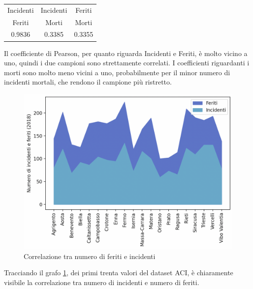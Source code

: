 \documentclass[a4paper]{report}
\begin{document}
\begin{center}
    \def\arraystretch{1.5}%
    \begin{tabular}{ |c|c|c| } 
    \hline
    Incidenti & Incidenti & Feriti \\ 
    Feriti & Morti & Morti \\ 
    \hline
    0.9836 & 0.3385 & 0.3355 \\ 
    \hline
    \end{tabular}
\end{center}

Il coefficiente di Pearson, per quanto riguarda Incidenti e Feriti, 
è molto vicino a uno, quindi i due campioni sono strettamente correlati.
I coefficienti riguardanti i morti sono molto meno vicini a uno, probabilmente per il minor numero 
di incidenti mortali, che rendono il campione più ristretto.

\begin{figure}
    \includegraphics[width=\linewidth]{../src/incidenti/incidenti_aci/comuni/corr_incidenti_feriti.png}
    \caption{Correlazione tra numero di feriti e incidenti}
    \label{fig:corr-incidenti-feriti}
\end{figure}

Tracciando il grafo \ref{fig:corr-incidenti-feriti}, dei primi trenta valori del dataset ACI, 
è chiaramente visibile la correlazione tra numero di incidenti e numero di feriti.


\end{document}
